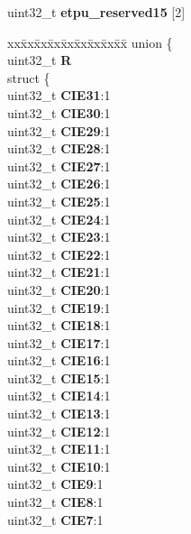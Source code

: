 \begin{DoxyCompactItemize}
\begin{tabbing}
\end{tabbing}\item 
\mbox{\label{structETPU__tag_aedd6afb11fa4ab3dc4bd70feb2328930}} 
uint32\+\_\+t {\bfseries etpu\+\_\+reserved15} \mbox{[}2\mbox{]}
\item 
\mbox{\label{structETPU__tag_a1736622360eefcbe116c4939595b2860}} 
\begin{tabbing}
xx\=xx\=xx\=xx\=xx\=xx\=xx\=xx\=xx\=\kill
union \{\\
\>uint32\_t {\bfseries R}\\
\>struct \{\\
\>\>uint32\_t {\bfseries CIE31}:1\\
\>\>uint32\_t {\bfseries CIE30}:1\\
\>\>uint32\_t {\bfseries CIE29}:1\\
\>\>uint32\_t {\bfseries CIE28}:1\\
\>\>uint32\_t {\bfseries CIE27}:1\\
\>\>uint32\_t {\bfseries CIE26}:1\\
\>\>uint32\_t {\bfseries CIE25}:1\\
\>\>uint32\_t {\bfseries CIE24}:1\\
\>\>uint32\_t {\bfseries CIE23}:1\\
\>\>uint32\_t {\bfseries CIE22}:1\\
\>\>uint32\_t {\bfseries CIE21}:1\\
\>\>uint32\_t {\bfseries CIE20}:1\\
\>\>uint32\_t {\bfseries CIE19}:1\\
\>\>uint32\_t {\bfseries CIE18}:1\\
\>\>uint32\_t {\bfseries CIE17}:1\\
\>\>uint32\_t {\bfseries CIE16}:1\\
\>\>uint32\_t {\bfseries CIE15}:1\\
\>\>uint32\_t {\bfseries CIE14}:1\\
\>\>uint32\_t {\bfseries CIE13}:1\\
\>\>uint32\_t {\bfseries CIE12}:1\\
\>\>uint32\_t {\bfseries CIE11}:1\\
\>\>uint32\_t {\bfseries CIE10}:1\\
\>\>uint32\_t {\bfseries CIE9}:1\\
\>\>uint32\_t {\bfseries CIE8}:1\\
\>\>uint32\_t {\bfseries CIE7}:1\\

\end{tabbing}
\end{DoxyCompactItemize}
